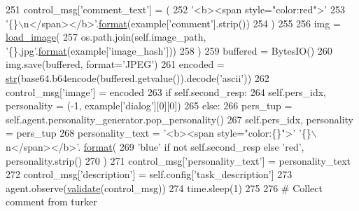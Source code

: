 \begin{DoxyCode}
251                 control\_msg[\textcolor{stringliteral}{'comment\_text'}] = (
252                     \textcolor{stringliteral}{'<b><span style="color:red">'}
253                     \textcolor{stringliteral}{'\{\}\(\backslash\)n</span></b>'}.\hyperlink{namespaceparlai_1_1chat__service_1_1services_1_1messenger_1_1shared__utils_a32e2e2022b824fbaf80c747160b52a76}{format}(example[\textcolor{stringliteral}{'comment'}].strip())
254                 )
255 
256             img = \hyperlink{namespacepersonality__captions_1_1worlds_a2863737d97a8e8c5a1ebe9029d0d2293}{load\_image}(
257                 os.path.join(self.image\_path, \textcolor{stringliteral}{'\{\}.jpg'}.\hyperlink{namespaceparlai_1_1chat__service_1_1services_1_1messenger_1_1shared__utils_a32e2e2022b824fbaf80c747160b52a76}{format}(example[\textcolor{stringliteral}{'image\_hash'}]))
258             )
259             buffered = BytesIO()
260             img.save(buffered, format=\textcolor{stringliteral}{'JPEG'})
261             encoded = \hyperlink{namespacegenerate__task__READMEs_a5b88452ffb87b78c8c85ececebafc09f}{str}(base64.b64encode(buffered.getvalue()).decode(\textcolor{stringliteral}{'ascii'}))
262             control\_msg[\textcolor{stringliteral}{'image'}] = encoded
263             \textcolor{keywordflow}{if} self.second\_resp:
264                 self.pers\_idx, personality = (-1, example[\textcolor{stringliteral}{'dialog'}][0][0])
265             \textcolor{keywordflow}{else}:
266                 pers\_tup = self.agent.personality\_generator.pop\_personality()
267                 self.pers\_idx, personality = pers\_tup
268             personality\_text = \textcolor{stringliteral}{'<b><span style="color:\{\}">'} \textcolor{stringliteral}{'\{\}\(\backslash\)n</span></b>'}.
      \hyperlink{namespaceparlai_1_1chat__service_1_1services_1_1messenger_1_1shared__utils_a32e2e2022b824fbaf80c747160b52a76}{format}(
269                 \textcolor{stringliteral}{'blue'} \textcolor{keywordflow}{if} \textcolor{keywordflow}{not} self.second\_resp \textcolor{keywordflow}{else} \textcolor{stringliteral}{'red'}, personality.strip()
270             )
271             control\_msg[\textcolor{stringliteral}{'personality\_text'}] = personality\_text
272             control\_msg[\textcolor{stringliteral}{'description'}] = self.config[\textcolor{stringliteral}{'task\_description'}]
273             agent.observe(\hyperlink{namespaceparlai_1_1core_1_1worlds_afc3fad603b7bce41dbdc9cdc04a9c794}{validate}(control\_msg))
274             time.sleep(1)
275 
276             \textcolor{comment}{# Collect comment from turker}

\end{DoxyCode}
